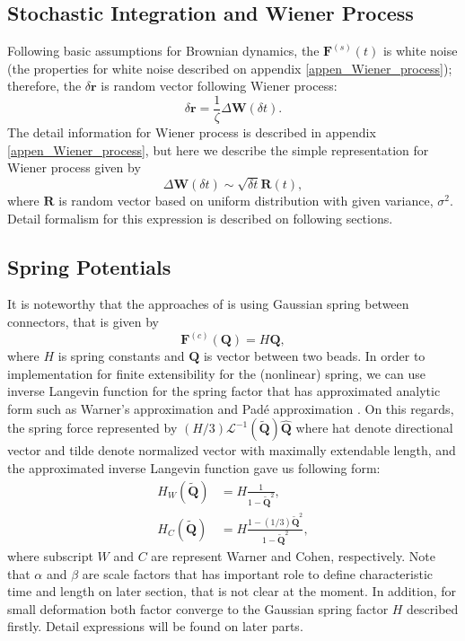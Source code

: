 \documentclass[10pt, a4paper]{article}
\begin{document}
\subsection{Stochastic Integration and Wiener Process} 
Following basic assumptions for Brownian dynamics, the $\mathbf{F}^{(s)}(t)$ is white noise (the properties for white noise described on appendix \ref{appen_Wiener_process}); therefore, the $\delta \mathbf{r}$ is random vector following Wiener process:
\begin{equation}
\delta \mathbf{r} = \frac{1}{\zeta} \Delta \mathbf{W} (\delta t).
\end{equation}
The detail information for Wiener process is described in appendix \ref{appen_Wiener_process}, but here we describe the simple representation for Wiener process given by \parencite{GREINER:1988cq, VandenBrule:1995fq}
\begin{equation}
\Delta \mathbf{W}(\delta t) \sim \sqrt{\delta t}\mathbf{R}(t),\label{eq:Wiener_process}
\end{equation}
where $\mathbf{R}$ is random vector based on uniform distribution with given variance, $\sigma^2$. 
Detail formalism for this expression is described on following sections.

\subsection{Spring Potentials}
It is noteworthy that the approaches of \textcite{VandenBrule:1995fq} is using Gaussian spring between connectors, that is given by
\begin{equation}
\mathbf{F}^{(c)}(\mathbf{Q}) = H\mathbf{Q},
\end{equation}
where $H$ is spring constants and $\mathbf{Q}$ is vector between two beads. 
In order to implementation for finite extensibility for the (nonlinear) spring, we can use inverse Langevin function for the spring factor that has approximated analytic form such as Warner's approximation \parencite{HaroldR.Warner1972} and Pad\'e approximation \parencite{Cohen1991}. 
On this regards, the spring force represented by $(H/3)\mathscr{L}^{-1}(\tilde{\mathbf{Q}})\hat{\mathbf{Q}}$ where hat denote directional vector and tilde denote normalized vector with maximally extendable length, and the approximated inverse Langevin function gave us following form:
\begin{align}
H_W(\tilde{\mathbf{Q}}) &= H\frac{1}{1-\tilde{\mathbf{Q}}^2}, \\
H_C(\tilde{\mathbf{Q}}) &= H\frac{1-(1/3)\tilde{\mathbf{Q}}^2}{1-\tilde{\mathbf{Q}}^2},
\end{align}
where subscript $W$ and $C$ are represent Warner and Cohen, respectively.
Note that $\alpha$ and $\beta$ are scale factors that has important role to define characteristic time and length on later section, that is not clear at the moment. In addition, for small deformation both factor converge to the Gaussian spring factor $H$ described firstly.
Detail expressions will be found on later parts.
\end{document}
